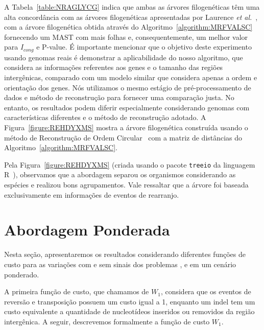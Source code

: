 

A Tabela~\ref{table:NRAGLYCG} indica que ambas as árvores filogenéticas têm uma alta concordância com as árvores filogenéticas apresentadas por Laurence \textit{et al.}~\cite{garczarek2020cyanorak}, com a árvore filogenética obtida através do Algoritmo~\ref{algorithm:MRFVALSC} fornecendo um MAST com mais folhas e, consequentemente, um melhor valor para $I_{cong}$ e P-value. É importante mencionar que o objetivo deste experimento usando genomas reais é demonstrar a aplicabilidade do nosso algoritmo, que considera as informações referentes aos genes e o tamanho das regiões intergênicas, comparado com um modelo similar que considera apenas a ordem e orientação dos genes. Nós utilizamos o mesmo estágio de pré-processamento de dados e método de reconstrução para fornecer uma comparação justa. No entanto, os resultados podem diferir especialmente considerando genomas com características diferentes e o método de reconstrução adotado. A Figura~\ref{figure:REHDYXMS} mostra a árvore filogenética construída usando o método de Reconstrução de Ordem Circular~\cite{makarenkov1997tree} com a matriz de distâncias do Algoritmo~\ref{algorithm:MRFVALSC}.



Pela Figura~\ref{figure:REHDYXMS} (criada usando o pacote \texttt{treeio} da linguagem R~\cite{wang2020treeio}), observamos que a abordagem separou os organismos considerando as espécies e realizou bons agrupamentos. Vale ressaltar que a árvore foi baseada exclusivamente em informações de eventos de rearranjo.

\section{Abordagem Ponderada}

Nesta seção, apresentaremos os resultados considerando diferentes funções de custo para as variações com e sem sinais dos problemas \SbWIRI{}, \SbWIRT{} e \SbWIRTI{} em um cenário ponderado.

A primeira função de custo, que chamamos de $W_1$, considera que os eventos de reversão e transposição possuem um custo igual a 1, enquanto um indel tem um custo equivalente a quantidade de nucleotídeos inseridos ou removidos da região intergênica. A seguir, descrevemos formalmente a função de custo $W_1$.

